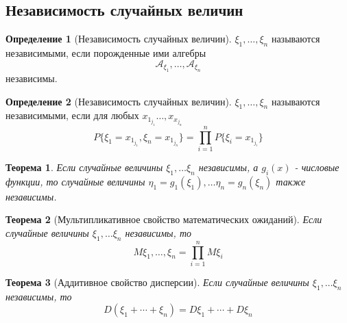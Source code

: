 \documentclass[a4paper]{article}
\newtheorem{theorem}{Теорема}[section]
\theoremstyle{definition}
\newtheorem*{definition}{Определение}
\theoremstyle{remark}
\begin{document}
\subsection{Независимость случайных величин}
\begin{definition}[Независимость случайных величин]
    $\xi_1, \dots, \xi_n$ называются независимыми, если порожденные ими алгебры \[\mathcal{A}_{\xi_1}, \dots, \mathcal{A}_{\xi_n}\] независимы.
\end{definition}
\begin{definition}[Независимость случайных величин]
    $\xi_1, \dots, \xi_n$ называются независимыми, если для любых $x_{1_{j_1}}\dots, x_{x_{j_n}}$
    \[P\{\xi_1 = x_{1_{j_1}}, \xi_n = x_{1_{j_n}}\} = \prod_{i = 1}^n P\{\xi_i = x_{1_{j_i}}\}\]
\end{definition}
\begin{theorem}
    Если случайные величины \(\xi_1, \dots \xi_n\) независимы, а \(g_i(x)\) - числовые функции, то случайные величины \(\eta_1 = g_1(\xi_1), \dots \eta_n = g_n(\xi_n) \) также независимы.
\end{theorem}
\begin{theorem}[Мультипликативное свойство математических ожиданий]
    Если случайные величины \(\xi_1, \dots \xi_n\) независимы, то 
    \[M \xi_1, \dots, \xi_n = \prod_{i = 1}^n M \xi_i\]
\end{theorem}
\begin{theorem}[Аддитивное свойство дисперсии]
    Если случайные величины \(\xi_1, \dots \xi_n\) независимы, то 
    \[D(\xi_1 + \cdots + \xi_n) = D\xi_1 + \cdots + D\xi_n\]
\end{theorem}
\end{document}
